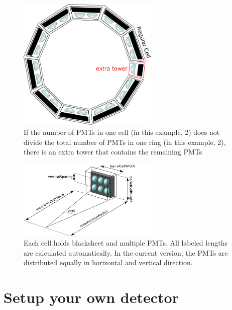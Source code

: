 \begin{figure}[p]
   \begin{center}
\includegraphics[width=0.60\textwidth]{extraTower} 
  \end{center}
\caption{If the number of PMTs in one cell (in this example, 2) does not divide the total number of PMTs in one ring (in this example, 2), there is an extra tower that contains the remaining PMTs}\label{fig:extra}
\end{figure}

\begin{figure}[p]
  \begin{center}
\includegraphics[width=0.60\textwidth]{Cell}
  \end{center}
\caption{Each cell holds blacksheet and multiple PMTs. All labeled lengths are calculated automatically. In the current version, the PMTs are distributed equally in horizontal and vertical direction.}
\end{figure}



\section{Setup your own detector}

